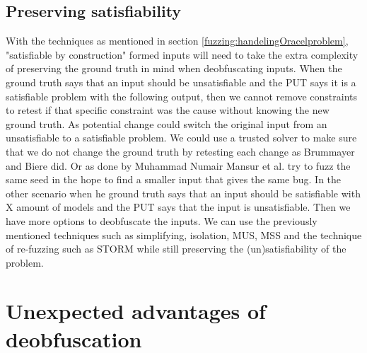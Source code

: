 \subsection{Preserving satisfiability}
\label{inputReduction:preservingSat}
With the techniques as mentioned in section \ref{fuzzing:handelingOracelproblem}, "satisfiable by construction" formed inputs will need to take the extra complexity of preserving the ground truth in mind when deobfuscating inputs. When the ground truth says that an input should be unsatisfiable and the PUT says it is a satisfiable problem with the following output, then we cannot remove constraints to retest if that specific constraint was the cause without knowing the new ground truth. As potential change could switch the original input from an unsatisfiable to a satisfiable problem. We could use a trusted solver to make sure that we do not change the ground truth by retesting each change as Brummayer and Biere \cite{2FuzzingAndDeltaDebuggingSMTSolvers} did.
Or as done by  Muhammad Numair Mansur et al. \cite{1mansur2020detecting} try to fuzz the same seed in the hope to find a smaller input that gives the same bug. 
In the other scenario when he ground truth says that an input should be satisfiable with X amount of models and the PUT says that the input is unsatisfiable. Then we have more options to deobfuscate the inputs. We can use the previously mentioned techniques such as simplifying, isolation, MUS, MSS and the technique of re-fuzzing such as STORM while still preserving the (un)satisfiability of the problem.

\section{Unexpected advantages of deobfuscation}
